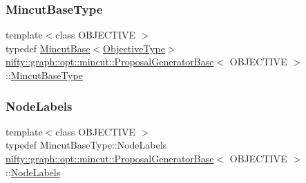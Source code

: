 \mbox{\label{classnifty_1_1graph_1_1opt_1_1mincut_1_1ProposalGeneratorBase_a2fd9fae5a15ac34ddfffaa2c36e48b7a}} 
\subsubsection{\texorpdfstring{Mincut\+Base\+Type}{MincutBaseType}}
{\footnotesize\ttfamily template$<$class O\+B\+J\+E\+C\+T\+I\+VE $>$ \\
typedef \hyperlink{classnifty_1_1graph_1_1opt_1_1mincut_1_1MincutBase}{Mincut\+Base}$<$\hyperlink{classnifty_1_1graph_1_1opt_1_1mincut_1_1ProposalGeneratorBase_aaec2f06ca64540523eba37fee037b527}{Objective\+Type}$>$ \hyperlink{classnifty_1_1graph_1_1opt_1_1mincut_1_1ProposalGeneratorBase}{nifty\+::graph\+::opt\+::mincut\+::\+Proposal\+Generator\+Base}$<$ O\+B\+J\+E\+C\+T\+I\+VE $>$\+::\hyperlink{classnifty_1_1graph_1_1opt_1_1mincut_1_1ProposalGeneratorBase_a2fd9fae5a15ac34ddfffaa2c36e48b7a}{Mincut\+Base\+Type}}

\mbox{\label{classnifty_1_1graph_1_1opt_1_1mincut_1_1ProposalGeneratorBase_a8e7bdb52139e951b4d4fc21c3cc6946a}} 
\subsubsection{\texorpdfstring{Node\+Labels}{NodeLabels}}
{\footnotesize\ttfamily template$<$class O\+B\+J\+E\+C\+T\+I\+VE $>$ \\
typedef Mincut\+Base\+Type\+::\+Node\+Labels \hyperlink{classnifty_1_1graph_1_1opt_1_1mincut_1_1ProposalGeneratorBase}{nifty\+::graph\+::opt\+::mincut\+::\+Proposal\+Generator\+Base}$<$ O\+B\+J\+E\+C\+T\+I\+VE $>$\+::\hyperlink{classnifty_1_1graph_1_1opt_1_1mincut_1_1ProposalGeneratorBase_a8e7bdb52139e951b4d4fc21c3cc6946a}{Node\+Labels}}

